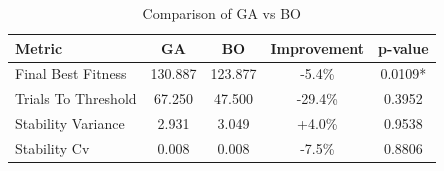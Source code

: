 \begin{table}[htbp]
\centering
\caption{Comparison of GA vs BO}
\label{tab:comparison}
\begin{tabular}{lcccc}
\hline
Metric & GA & BO & Improvement & p-value \\
\hline
Final Best Fitness & 130.887 & 123.877 & -5.4\% & 0.0109* \\
Trials To Threshold & 67.250 & 47.500 & -29.4\% & 0.3952 \\
Stability Variance & 2.931 & 3.049 & +4.0\% & 0.9538 \\
Stability Cv & 0.008 & 0.008 & -7.5\% & 0.8806 \\
\hline
\end{tabular}
\end{table}

